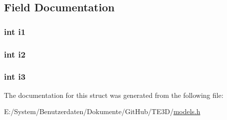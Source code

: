 \subsection{Field Documentation}
\hypertarget{struct_t_e3_d___vector_index3_ac1148b6c7c73300331ae93335f42241d}{
\subsubsection[{i1}]{\setlength{\rightskip}{0pt plus 5cm}int i1}}\label{struct_t_e3_d___vector_index3_ac1148b6c7c73300331ae93335f42241d}
\hypertarget{struct_t_e3_d___vector_index3_a48d37c88961428889f8b283379ab961c}{
\subsubsection[{i2}]{\setlength{\rightskip}{0pt plus 5cm}int i2}}\label{struct_t_e3_d___vector_index3_a48d37c88961428889f8b283379ab961c}
\hypertarget{struct_t_e3_d___vector_index3_a46d0b19c5363d1d6b47ff947ff767ecb}{
\subsubsection[{i3}]{\setlength{\rightskip}{0pt plus 5cm}int i3}}\label{struct_t_e3_d___vector_index3_a46d0b19c5363d1d6b47ff947ff767ecb}


The documentation for this struct was generated from the following file\-:\begin{DoxyCompactItemize}
\item 
E\-:/\-System/\-Benutzerdaten/\-Dokumente/\-Git\-Hub/\-T\-E3\-D/\hyperlink{models_8h}{models.\-h}\end{DoxyCompactItemize}
